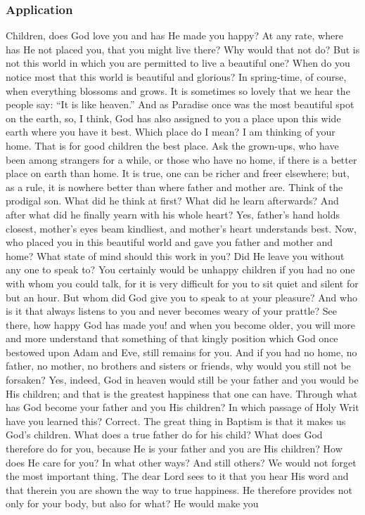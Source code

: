\subsubsection{Application} Children, does God love you and has He made you happy? At any rate, where has He not placed you, that you might live there? Why would that not do? But is not this world in which
you are permitted to live a beautiful one? When do you notice most that this world is beautiful and glorious? In spring-time, of course, when everything blossoms and grows. It is sometimes so lovely that we hear the people say: “It is like heaven.” And as Paradise once was the most beautiful spot on the earth, so, I think, God has also assigned to you a place upon this wide earth where you have it best. Which place do I mean? I am thinking of your home. That is for good children the best place. Ask the grown-ups, who have been among strangers for a while, or those who have no home, if there is a better place on earth than home. It is true, one can be richer and freer elsewhere; but, as a rule, it is nowhere better than where father and mother are. Think of the prodigal son. What did he think at first? What did he learn afterwards? And after what did he finally yearn with his whole heart? Yes, father’s hand holds closest, mother’s eyes beam kindliest, and mother’s heart understands best. Now, who placed you in this beautiful world and gave you father and mother and home? What state of mind should this work in you? Did He leave you without any one to speak to? You certainly would be unhappy children if you had no one with whom you could talk, for it is very difficult for you to sit quiet and silent for but an hour. But whom did God give you to speak to at your pleasure? And who is it that always listens to you and never becomes weary of your prattle? See there, how happy God has made you! and when you become older, you will more and more understand that something of that kingly position which God once bestowed upon Adam and Eve, still remains for you. And if you had no home, no father, no mother, no brothers and sisters or friends, why would you still not be forsaken? Yes, indeed, God in heaven would still be your father and you would be His children; and that is the greatest happiness that one can have. Through what has God become your father and you His children? In which passage of Holy Writ have you learned this? Correct. The great thing in Baptism is that it makes us God’s children. What does a true father do for his child? What does God therefore do for you, because He is your father and you are His children? How does He care for you? In what other ways? And still others? We would not forget the most important thing. The dear Lord sees to it that you hear His word and that therein you are shown the way to true happiness. He therefore provides not only for your body, but also for what? He would make you
